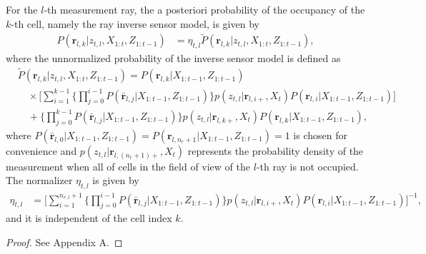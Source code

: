 \begin{prop}
\label{prop:ISM}
For the $l$-th measurement ray, the a posteriori probability of the occupancy of the $k$-th cell, namely the ray inverse sensor model, is given by
\begin{align}
\label{eqn:RayISMAnswer}
P(\mathbf{r}_{l,k}|z_{t,l},X_{1:t},Z_{1:t-1})&=\eta_{t,l}\tilde P(\mathbf{r}_{l,k}|z_{t,l},X_{1:t},Z_{1:t-1}),
\end{align}
where the unnormalized probability of the inverse sensor model is defined as
\begin{align}
\label{eqn:Unnormalized}
& \tilde P(\mathbf{r}_{l,k}|z_{t,l},X_{1:t},Z_{1:t-1})%
=P(\mathbf{r}_{l,k}|X_{1:t-1},Z_{1:t-1})\nonumber\\
&\quad\times 
\bigg[\sum_{i=1}^{k-1}\bigg\{\prod_{j=0}^{i-1}P(\bar{\mathbf{r}}_{l,j}|X_{1:t-1},Z_{1:t-1})\bigg\}%
p(z_{t,l}|\mathbf{r}_{l,i+},X_t)P(\mathbf{r}_{l,i}|X_{1:t-1},Z_{1:t-1})\bigg]\nonumber\\
&\quad + \bigg\{\prod_{j=0}^{k-1}P(\bar{\mathbf{r}}_{l,j}|X_{1:t-1},Z_{1:t-1})\bigg\}%
p(z_{t,l}|\mathbf{r}_{l,k+},X_t)P(\mathbf{r}_{l,k}|X_{1:t-1},Z_{1:t-1}),
\end{align}
where $P(\bar{\mathbf{r}}_{l,0}|X_{1:t-1},Z_{1:t-1})=P(\mathbf{r}_{l,n_r+1}|X_{1:t-1},Z_{1:t-1})=1$ is chosen for convenience and $p(z_{t,l}|\mathbf{r}_{l,(n_r+1)+},X_t)$ represents the probability density of the measurement when all of cells in the field of view of the $l$-th ray is not occupied. The normalizer $\eta_{t,l}$ is given by
\begin{align}
\label{eqn:allEta}
\eta_{t,l}
&=
\bigg[\sum_{i=1}^{n_{r,l}+1}\bigg\{\prod_{j=0}^{i-1}P(\bar{\mathbf{r}}_{l,j}|X_{1:t-1},Z_{1:t-1})\bigg\}p(z_{t,l}|\mathbf{r}_{l,i+},X_t)P(\mathbf{r}_{l,i}|X_{1:t-1},Z_{1:t-1})\bigg]^{-1},
\end{align}
and it is independent of the cell index $k$.
\end{prop}
\begin{proof}%
See Appendix A.
\end{proof}


